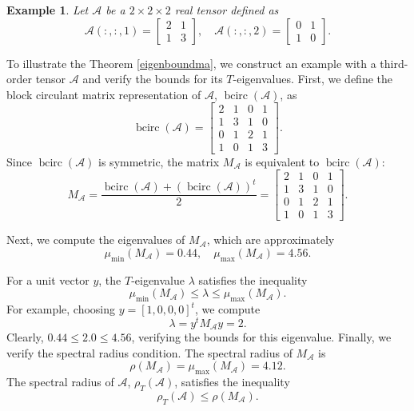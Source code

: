 \documentclass[oupthm]{CUP-JNL-BCM}%
\theoremstyle{oupplain}
\theoremstyle{oupdefinition}
\theoremstyle{oupremark}
\newtheorem{example}[theorem]{Example}
\theoremstyle{oupproof}
\numberwithin{equation}{section}
\begin{document}
\begin{example}
Let \(\mathcal{A}\) be a \(2 \times 2 \times 2\) real tensor defined as
\[
\mathcal{A}(:, :, 1) = \begin{bmatrix} 2 & 1 \\ 1 & 3 \end{bmatrix}, \quad  
\mathcal{A}(:, :, 2) = \begin{bmatrix} 0 & 1 \\ 1 & 0 \end{bmatrix}.
\]  
\end{example}
\noindent To illustrate the Theorem \ref{eigenboundma}, we construct an example with a third-order tensor \(\mathcal{A}\) and verify the bounds for its \(T\)-eigenvalues.  First, we define the block circulant matrix representation of \(\mathcal{A}\), \(\operatorname{bcirc}(\mathcal{A})\), as
\[
\operatorname{bcirc}(\mathcal{A}) =  
\begin{bmatrix}  
2 & 1 & 0 & 1 \\  
1 & 3 & 1 & 0 \\  
0 & 1 & 2 & 1 \\  
1 & 0 & 1 & 3  
\end{bmatrix}.
\]  
Since \(\operatorname{bcirc}(\mathcal{A})\) is symmetric, the matrix \(M_{\mathcal{A}}\) is equivalent to \(\operatorname{bcirc}(\mathcal{A})\):  
\[
M_{\mathcal{A}} = \frac{\operatorname{bcirc}(\mathcal{A}) + (\operatorname{bcirc}(\mathcal{A}))^t}{2} =  
\begin{bmatrix}  
2 & 1 & 0 & 1 \\  
1 & 3 & 1 & 0 \\  
0 & 1 & 2 & 1 \\  
1 & 0 & 1 & 3  
\end{bmatrix}.
\]  

\noindent Next, we compute the eigenvalues of \(M_{\mathcal{A}}\), which are approximately
\[
\mu_{\min}(M_{\mathcal{A}}) = 0.44, \quad \mu_{\max}(M_{\mathcal{A}}) = 4.56.
\]  

\noindent For a unit vector \(y\), the \(T\)-eigenvalue \(\lambda\) satisfies the inequality
\[
\mu_{\min}(M_{\mathcal{A}}) \leq \lambda \leq \mu_{\max}(M_{\mathcal{A}}).
\]  
For example, choosing \(y = [1, 0, 0, 0]^t\), we compute
\[
\lambda = y^t M_{\mathcal{A}} y = 2.
\]  
Clearly, \(0.44 \leq 2.0 \leq 4.56\), verifying the bounds for this eigenvalue.  Finally, we verify the spectral radius condition. The spectral radius of \(M_{\mathcal{A}}\) is
\[
\rho(M_{\mathcal{A}}) = \mu_{\max}(M_{\mathcal{A}}) = 4.12.
\]  
The spectral radius of \(\mathcal{A}\), \(\rho_T(\mathcal{A})\), satisfies the inequality
\[
\rho_T(\mathcal{A}) \leq \rho(M_{\mathcal{A}}).
\]  
\end{document}
